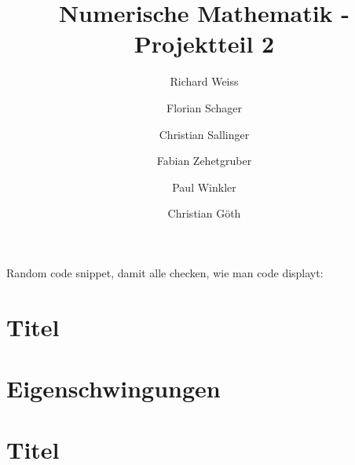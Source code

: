 \documentclass{article}
\title{Numerische Mathematik - Projektteil 2}
\author
{
  Richard Weiss       \and
  Florian Schager     \and
  Christian Sallinger \and
  Fabian Zehetgruber  \and
  Paul Winkler        \and
  Christian Göth
}
\date{}
\begin{document}
\maketitle

Random code snippet, damit alle checken, wie man code displayt:


\section{Titel}


\section{Eigenschwingungen}


\section{Titel}

\end{document}
